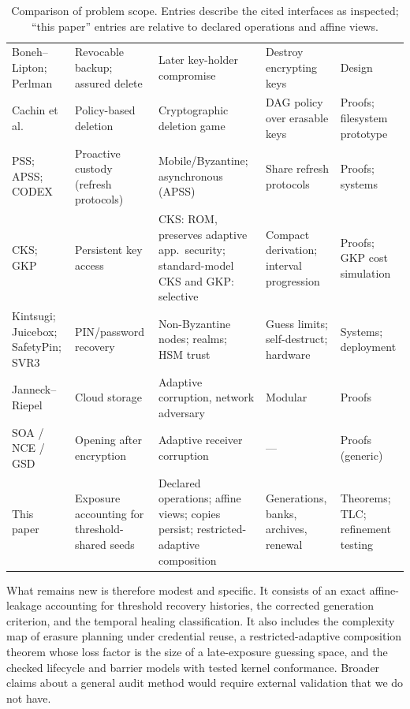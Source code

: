 \documentclass[pdflatex,sn-mathphys-num,twocolumn]{sn-jnl}
\theoremstyle{plain}
\theoremstyle{definition}
\begin{document}
\begin{table}[t]
\caption{Comparison of problem scope. Entries describe the cited interfaces as inspected; ``this paper'' entries are relative to declared operations and affine views.}\label{tab:comparison}
\centering\footnotesize
\altrows
\begin{tabularx}{\linewidth}{@{}p{.15\linewidth}YYYY@{}}\toprule
{} &  &  &  & \\\midrule
Boneh--Lipton; Perlman & Revocable backup; assured delete & Later key-holder compromise & Destroy encrypting keys & Design\\
Cachin et al. & Policy-based deletion & Cryptographic deletion game & DAG policy over erasable keys & Proofs; filesystem prototype\\
PSS; APSS; CODEX & Proactive custody (refresh protocols) & Mobile/Byzantine; asynchronous (APSS) & Share refresh protocols & Proofs; systems\\
CKS; GKP & Persistent key access & CKS: ROM, preserves adaptive app.\ security; standard-model CKS and GKP: selective & Compact derivation; interval progression & Proofs; GKP cost simulation\\
Kintsugi; Juicebox; SafetyPin; SVR3 & PIN/password recovery & Non-Byzantine nodes; realms; HSM trust & Guess limits; self-destruct; hardware & Systems; deployment\\
Janneck--Riepel & Cloud storage & Adaptive corruption, network adversary & Modular & Proofs\\
SOA / NCE / GSD & Opening after encryption & Adaptive receiver corruption & --- & Proofs (generic)\\
This paper & Exposure accounting for threshold-shared seeds & Declared operations; affine views; copies persist; restricted-adaptive composition & Generations, banks, archives, renewal & Theorems; TLC; refinement testing\\\bottomrule
\end{tabularx}
\end{table}

What remains new is therefore modest and specific. It consists of an exact affine-leakage accounting for threshold recovery histories, the corrected generation criterion, and the temporal healing classification. It also includes the complexity map of erasure planning under credential reuse, a restricted-adaptive composition theorem whose loss factor is the size of a late-exposure guessing space, and the checked lifecycle and barrier models with tested kernel conformance. Broader claims about a general audit method would require external validation that we do not have.
\end{document}
